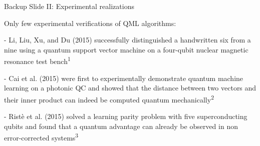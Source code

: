 \documentclass[10pt]{beamer}
\begin{document}
{
\begin{frame}[fragile]{Backup Slide II: Experimental realizations}


Only few experimental verifications of QML algorithms:

- Li, Liu, Xu, and Du (2015) successfully distinguished a handwritten six from a nine using a
quantum support vector machine on a four-qubit nuclear magnetic resonance test bench\textsuperscript{1}

- Cai et al. (2015) were first to experimentally demonstrate quantum machine learning on a photonic QC and showed that the distance between two vectors and their inner product can indeed be computed quantum
mechanically\textsuperscript{2}

- Ristè et al. (2015) solved a learning parity problem with five superconducting qubits and found that a quantum advantage can already be observed in non error-corrected systems\textsuperscript{3}




\end{frame}
}
\end{document}
